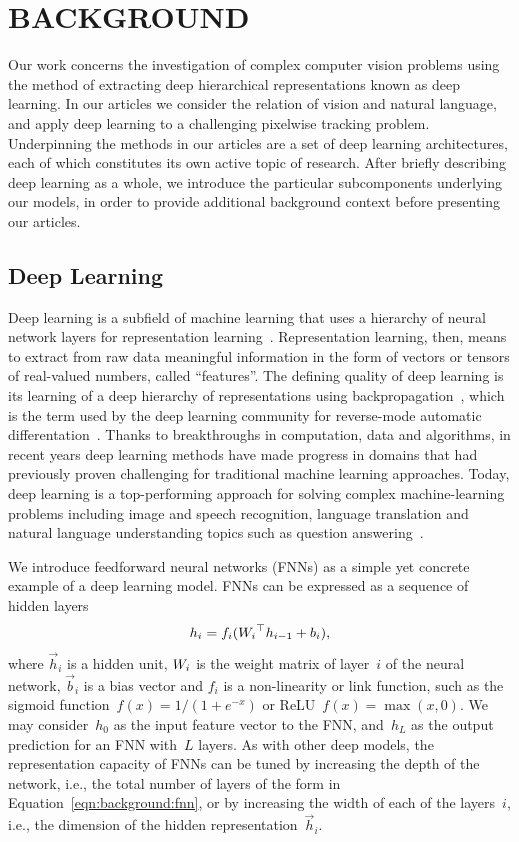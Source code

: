 \chapter{BACKGROUND}

Our work concerns the investigation of complex computer vision problems using
the method of extracting deep hierarchical representations known as deep
learning.
In our articles we consider the relation of vision and natural language, and
apply deep learning to a challenging pixelwise tracking problem.
Underpinning the methods in our articles are a set of deep learning
architectures, each of which constitutes its own active topic of research.
After briefly describing deep learning as a whole, we introduce the particular
subcomponents underlying our models, in order to provide additional background
context before presenting our articles.


\section{Deep Learning}

Deep learning is a subfield of machine learning that uses a hierarchy of neural
network layers for representation learning~\citep{lecun2015deeplearning}.
Representation learning, then, means to extract from raw data meaningful
information in the form of vectors or tensors of real-valued numbers, called
``features''.
The defining quality of deep learning is its learning of a deep hierarchy of
representations using backpropagation~\citep{rumelhart1988learningreps}, which
is the term used by the deep learning community for reverse-mode automatic
differentation~\citep{griewank2008evaluatingderivatives}.
Thanks to breakthroughs in computation, data and algorithms, in recent years
deep learning methods have made progress in domains that had previously proven
challenging for traditional machine learning approaches.
Today, deep learning is a top-performing approach for solving complex
machine-learning problems including image and speech recognition, language
translation and natural language understanding topics such as question
answering~\citep{lecun2015deeplearning}.

We introduce feedforward neural networks (FNNs) as a simple yet concrete
example of a deep learning model.
FNNs can be expressed as a sequence of hidden layers
\begin{equation}
h_i = f_i({W_i}^\top h_{i - 1} + b_i),
\label{eqn:background:fnn}
\end{equation}
where $\vec{h}_i$ is a hidden unit, $W_i$ is the weight matrix of
layer~$i$ of the neural network, $\vec{b}_i$ is a bias vector and $f_i$ is a
non-linearity or link function, such as the sigmoid
function~$f(x) = 1/(1 + e^{-x})$ or ReLU~$f(x) = \max(x, 0)$.
We may consider~$h_0$ as the input feature vector to the FNN, and~$h_L$ as the
output prediction for an FNN with~$L$ layers.
As with other deep models, the representation capacity of FNNs can be tuned by
increasing the depth of the network, i.e., the total number of layers of the
form in Equation~\ref{eqn:background:fnn}, or by increasing the width of each
of the layers~$i$, i.e., the dimension of the hidden
representation~$\vec{h}_i$.

